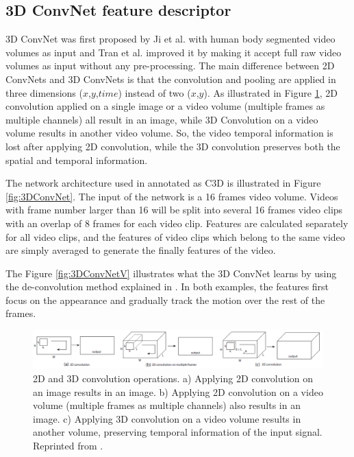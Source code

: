 \subsection{3D ConvNet feature descriptor}
\label{2_3_3}
3D ConvNet was first proposed by Ji et al. \cite{Ji2013} with human body segmented video volumes as input and Tran et al. \cite{Tran2015} improved it by making it accept full raw video volumes as input without any pre-processing. The main difference between 2D ConvNets and 3D ConvNets is that the convolution and pooling are applied in three dimensions (\(x\),\(y\),\(time\)) instead of two (\(x\),\(y\)). As illustrated in Figure \ref{fig:3DConv}, 2D convolution applied on a single image or a video volume (multiple frames as multiple channels) all result in an image, while 3D Convolution on a video volume results in another video volume. So, the video temporal information is lost after applying 2D convolution, while the 3D convolution preserves both the spatial and temporal information. 
\par 
The network architecture used in \cite{Tran2015} annotated as C3D is illustrated in Figure \ref{fig:3DConvNet}. The input of the network is a 16 frames video volume. Videos with frame number larger than 16 will be split into several 16 frames video clips with an overlap of 8 frames for each video clip.  Features are calculated separately for all video clips, and the features of video clips which belong to the same video are simply averaged to generate the finally features of the video. 
\par
The Figure \ref{fig:3DConvNetV} illustrates what the 3D ConvNet learns by using the de-convolution method explained in \cite{zeiler2014}. In both examples, the features first focus on the appearance and gradually track the motion over the rest of the frames. 

\begin{figure}
	\includegraphics[width=\linewidth]{figs/3DConv.png}
	\caption{2D and 3D convolution operations. a) Applying 2D convolution on an image results in an image. b) Applying 2D convolution
		on a video volume (multiple frames as multiple channels) also results in an image. c) Applying 3D convolution on a video volume results
		in another volume, preserving temporal information of the input signal. Reprinted from \cite{Tran2015}.}
	\label{fig:3DConv}
\end{figure}

